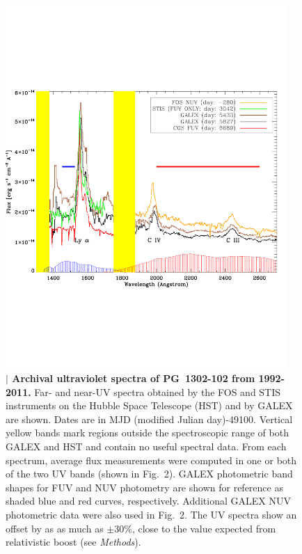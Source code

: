 \begin{figure}
\centering
\includegraphics[width=0.95\textwidth]{figures/ch4/fig3.pdf}
\vspace{-8\baselineskip}
\caption{{\bf $\mid$ Archival ultraviolet spectra of PG~1302-102 from
    1992-2011.}  Far- and near-UV spectra obtained by the FOS and STIS
  instruments on the Hubble Space Telescope (HST) and by GALEX are
  shown. Dates are in MJD (modified Julian day)-49100. Vertical yellow
  bands mark regions outside the spectroscopic range of both GALEX and
  HST and contain no useful spectral data.  From each spectrum,
  average flux measurements were computed in one or both of the two UV
  bands (shown in Fig.~2).  GALEX photometric band shapes for FUV and
  NUV photometry are shown for reference as shaded blue and red
  curves, respectively.  Additional GALEX NUV photometric data were
  also used in Fig.~2.  The UV spectra show an offset by as as much as
  $\pm$30\%, close to the value expected from relativistic boost (see
  {\it Methods}).}
\label{fig:spectra}
\end{figure}







